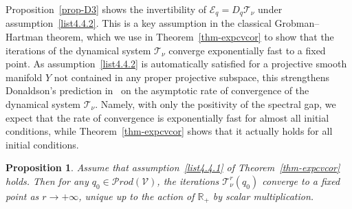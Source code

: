 \documentclass[11pt]{article}
\newtheorem{prop}[theo]{Proposition}
\theoremstyle{definition}
\numberwithin{equation}{section}
\numberwithin{figure}{section}
\numberwithin{table}{section}
\let\cal\mathscr
\newcommand{\R}{{\mathbb{R}}}
\newcommand{\cE}{{\mathcal{E}}}
\newcommand{\cV}{{\mathcal{V}}}
\newcommand\< {\mathcal{h}}
\renewcommand\> {\mathcal{i}}
\newcommand\TT {{\cal T}}
\newcommand{\Prod}{{\mathcal Prod}}
\begin{document}
Proposition~\ref{prop-D3} shows the invertibility of $\cE_q=D_q\TT_\nu$ under assumption~\eqref{list4.4.2}. This is a key assumption in the classical Grobman--Hartman theorem, which we use in Theorem~\ref{thm-expcvcor} to show that the iterations of the dynamical system $\TT_\nu$ converge exponentially fast to a fixed point. As assumption~\eqref{list4.4.2} is automatically satisfied for a projective smooth manifold $Y$ not contained in any proper projective subspace, this strengthens Donaldson's prediction in~\cite[Section~4.1]{D} on the asymptotic rate of convergence of the dynamical system $\TT_\nu$. Namely, with only the positivity of the spectral gap, we expect that the rate of convergence is exponentially fast for almost all initial conditions, while Theorem~\ref{thm-expcvcor} shows that it actually holds for all initial conditions.


%

\begin{prop}\label{Psicv}
Assume that assumption~\eqref{list4.4.1} of Theorem~\ref{thm-expcvcor} holds. Then for any $q_0\in\Prod(\cV)$, the iterations $\TT_\nu^r (q_0)$ converge to a fixed point as $r\to+\infty$, unique up to the action of $\R_+$ by scalar multiplication.
\end{prop}
\end{document}
